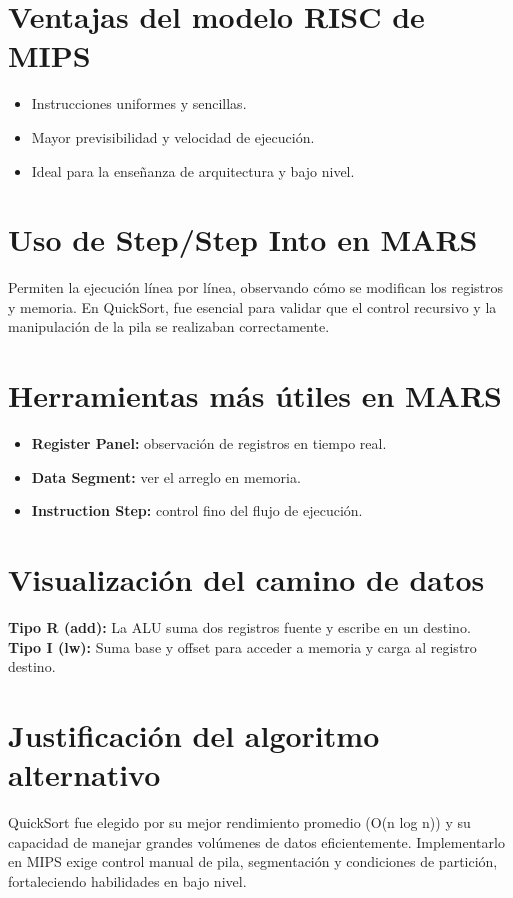 \documentclass[12pt]{article}
\begin{document}
\section{Ventajas del modelo RISC de MIPS}
\begin{itemize}
    \item Instrucciones uniformes y sencillas.
    \item Mayor previsibilidad y velocidad de ejecución.
    \item Ideal para la enseñanza de arquitectura y bajo nivel.
\end{itemize}

\section{Uso de Step/Step Into en MARS}
Permiten la ejecución línea por línea, observando cómo se modifican los registros y memoria. En QuickSort, fue esencial para validar que el control recursivo y la manipulación de la pila se realizaban correctamente.

\section{Herramientas más útiles en MARS}
\begin{itemize}
    \item \textbf{Register Panel:} observación de registros en tiempo real.
    \item \textbf{Data Segment:} ver el arreglo en memoria.
    \item \textbf{Instruction Step:} control fino del flujo de ejecución.
\end{itemize}

\section{Visualización del camino de datos}
\textbf{Tipo R (add):} La ALU suma dos registros fuente y escribe en un destino.\\
\textbf{Tipo I (lw):} Suma base y offset para acceder a memoria y carga al registro destino.

\section{Justificación del algoritmo alternativo}
QuickSort fue elegido por su mejor rendimiento promedio (O(n log n)) y su capacidad de manejar grandes volúmenes de datos eficientemente. Implementarlo en MIPS exige control manual de pila, segmentación y condiciones de partición, fortaleciendo habilidades en bajo nivel.
\end{document}
